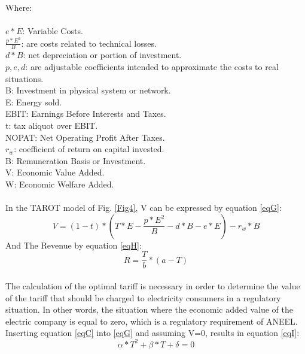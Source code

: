 \documentclass[preprint,12pt]{elsarticle}
\begin{document}
Where:\\\\
$e*E$: Variable Costs.\\
$\frac{p*E^2}{B}$: are costs related to technical losses. \\
$d*B$: net depreciation or portion of investment.\\
$p, e, d$: are adjustable coefficients intended to approximate the costs to real situations.\\
B: Investment in physical system or network.\\
E: Energy sold.\\
EBIT: Earnings Before Interests and Taxes.\\
t: tax aliquot over EBIT.\\
NOPAT: Net Operating Profit After Taxes.\\
$r_w$: coefficient of return on capital invested.\\
B: Remuneration Basis or Investment.\\
V: Economic Value Added.\\
W: Economic Welfare Added.\\\\
In the TAROT model of Fig. \ref{Fig4}, V can be expressed by equation \ref{eqG}:\\
\begin{equation}
V = (1-t)*\left( T*E - \frac{p*E^2}{B} - d*B - e*E \right)   - r_w *B
\label{eqG}
\end{equation}
And The Revenue by equation \ref{eqH}:\\
\begin{equation}
R = \frac{T}{b} * (a-T)
\label{eqH}
\end{equation}\\
The calculation of the optimal tariff is necessary in order to determine the value of the tariff that should be charged to electricity consumers in a regulatory situation. In other words, the situation where the economic added value of the electric company is equal to zero, which is a regulatory requirement of ANEEL.\\
Inserting equation \ref{eqC} into \ref{eqG} and assuming V=0, results in equation \ref{eqI}:\\
\begin{equation}
\alpha * T^2 +\beta * T + \delta = 0
\label{eqI}
\end{equation}\\
\end{document}
